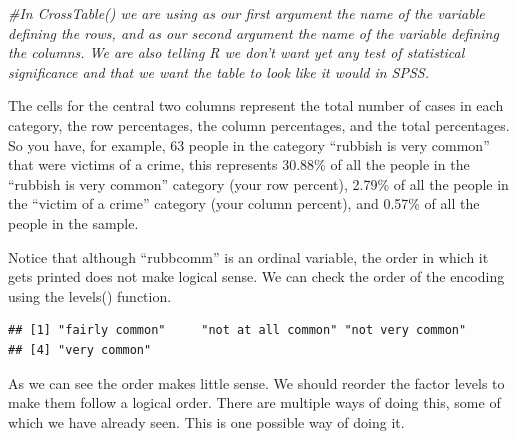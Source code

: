 \documentclass[]{book}
\newenvironment{Shaded}{\begin{snugshade}}{\end{snugshade}}
\newcommand{\CommentTok}[1]{\textcolor[rgb]{0.56,0.35,0.01}{\textit{#1}}}
\newcommand{\DataTypeTok}[1]{\textcolor[rgb]{0.13,0.29,0.53}{#1}}
\newcommand{\KeywordTok}[1]{\textcolor[rgb]{0.13,0.29,0.53}{\textbf{#1}}}
\newcommand{\NormalTok}[1]{#1}
\newcommand{\OperatorTok}[1]{\textcolor[rgb]{0.81,0.36,0.00}{\textbf{#1}}}
\newcommand{\StringTok}[1]{\textcolor[rgb]{0.31,0.60,0.02}{#1}}
\theoremstyle{definition}
\theoremstyle{definition}
\theoremstyle{definition}
\theoremstyle{remark}
\begin{document}
\begin{Shaded}
\begin{Highlighting}[]
\CommentTok{#In CrossTable() we are using as our first argument the name of the variable defining the rows, and as our second argument the name of the variable defining the columns. We are also telling R we don't want yet any test of statistical significance and that we want the table to look like it would in SPSS.}
\end{Highlighting}
\end{Shaded}

The cells for the central two columns represent the total number of
cases in each category, the row percentages, the column percentages, and
the total percentages. So you have, for example, 63 people in the
category ``rubbish is very common'' that were victims of a crime, this
represents 30.88\% of all the people in the ``rubbish is very common''
category (your row percent), 2.79\% of all the people in the ``victim of
a crime'' category (your column percent), and 0.57\% of all the people
in the sample.

Notice that although ``rubbcomm'' is an ordinal variable, the order in
which it gets printed does not make logical sense. We can check the
order of the encoding using the levels() function.

\begin{Shaded}
\end{Shaded}

\begin{verbatim}
## [1] "fairly common"     "not at all common" "not very common"  
## [4] "very common"
\end{verbatim}

As we can see the order makes little sense. We should reorder the factor
levels to make them follow a logical order. There are multiple ways of
doing this, some of which we have already seen. This is one possible way
of doing it.

\begin{Shaded}
\end{Shaded}
\end{document}
